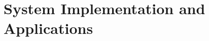 \documentclass[preprint,9pt]{sigplanconf}
\newcommand{\ctraps}{CTraps\xspace}
\newcommand{\ctrapsfull}{CTraps-Full\xspace}
\newcommand{\lwt}{LWT\xspace}
\begin{document}
%
%
%
%


%
%


\section{System Implementation and Applications}
\end{document}

